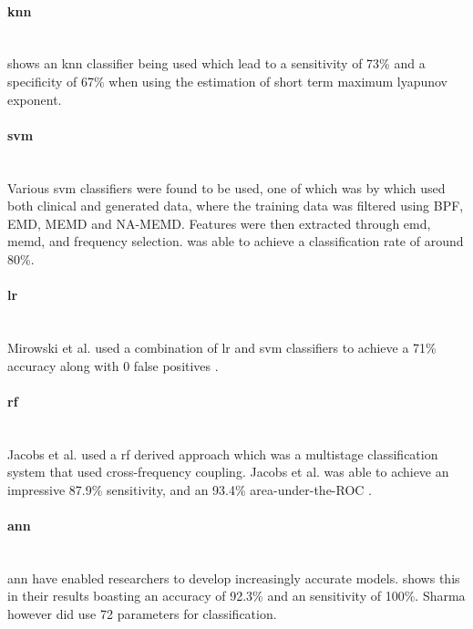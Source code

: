 \documentclass[12pt]{article}
\begin{document}
\paragraph{\acrfull{knn}}\mbox{}\\


\cite{wang2013online} shows an \acrshort{knn} classifier being used which lead to a sensitivity of 73\% and a specificity of 67\% when using the estimation of short term maximum lyapunov exponent.


\paragraph{\acrfull{svm}}\mbox{}\\


Various \acrshort{svm} classifiers were found to be used, one of which was by \cite{cho2016eeg} which used both clinical and generated data, where the training data was filtered using BPF, EMD, MEMD and NA-MEMD. Features were then extracted through \acrshort{emd}, \acrshort{memd}, and frequency selection.\cite{cho2016eeg} was able to achieve a classification rate of around 80\%.

\paragraph{\acrfull{lr}}\mbox{}\\

Mirowski et al. used a combination of \acrshort{lr} and \acrshort{svm} classifiers to achieve a 71\% accuracy along with 0 false positives \cite{mirowski2009classification}.

\paragraph{\acrfull{rf}}\mbox{}\\

Jacobs et al. used a \acrshort{rf} derived approach which was a multistage classification system that used cross-frequency coupling. Jacobs et al. was able to achieve an impressive 87.9\% sensitivity, and an 93.4\% area-under-the-ROC \cite{jacobs2018classification}.

\paragraph{\acrfull{ann}}\mbox{}\\

\acrshort{ann} have enabled researchers to develop increasingly accurate models. \cite{sharma2018epileptic} shows this in their results boasting an accuracy of 92.3\% and an sensitivity of 100\%. Sharma however did use 72 parameters for classification. 
\end{document}
